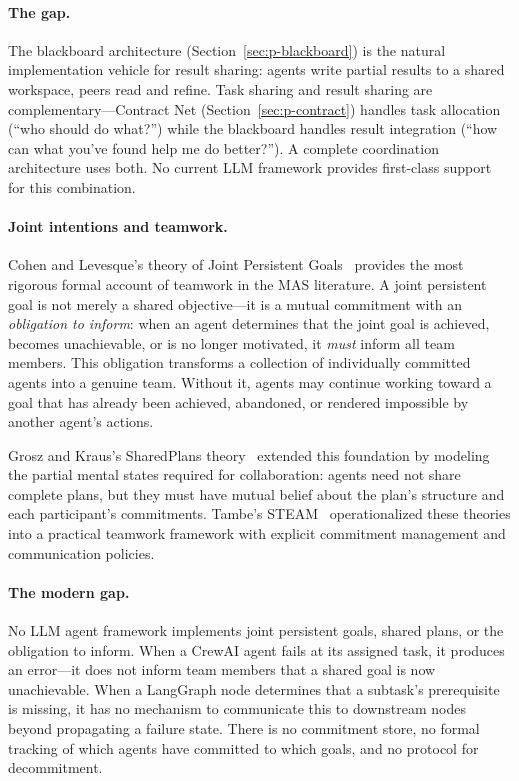 \documentclass{article}
\begin{document}
\paragraph{The gap.}
The blackboard architecture (Section~\ref{sec:p-blackboard}) is the natural
implementation vehicle for result sharing: agents write partial results to a shared
workspace, peers read and refine. Task sharing and result sharing are complementary---Contract
Net (Section~\ref{sec:p-contract}) handles task allocation (``who should do what?'')
while the blackboard handles result integration (``how can what you've found help me
do better?''). A complete coordination architecture uses both. No current LLM framework
provides first-class support for this combination.

\paragraph{Joint intentions and teamwork.}
\label{sec:p-joint}
Cohen and Levesque's theory of Joint Persistent Goals~\citep{cohen1990intention}
provides the most rigorous formal account of teamwork in the MAS literature. A joint
persistent goal is not merely a shared objective---it is a mutual commitment with an
\emph{obligation to inform}: when an agent determines that the joint goal is achieved,
becomes unachievable, or is no longer motivated, it \emph{must} inform all team members.
This obligation transforms a collection of individually committed agents into a genuine
team. Without it, agents may continue working toward a goal that has already been
achieved, abandoned, or rendered impossible by another agent's actions.

Grosz and Kraus's SharedPlans theory~\citep{grosz1996collaborative} extended this
foundation by modeling the partial mental states required for collaboration: agents need
not share complete plans, but they must have mutual belief about the plan's structure
and each participant's commitments. Tambe's STEAM~\citep{tambe1997flexible}
operationalized these theories into a practical teamwork framework with explicit
commitment management and communication policies.

\paragraph{The modern gap.}
No LLM agent framework implements joint persistent goals, shared plans, or the
obligation to inform. When a CrewAI agent fails at its assigned task, it produces an
error---it does not inform team members that a shared goal is now unachievable. When a
LangGraph node determines that a subtask's prerequisite is missing, it has no mechanism
to communicate this to downstream nodes beyond propagating a failure state. There is no
commitment store, no formal tracking of which agents have committed to which goals, and
no protocol for decommitment.
\end{document}
